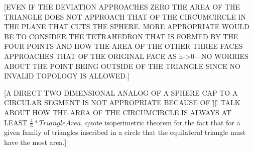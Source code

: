 [EVEN IF THE DEVIATION APPROACHES ZERO THE AREA OF THE TRIANGLE DOES NOT APPROACH THAT OF THE CIRCUMCIRCLE IN THE PLANE THAT CUTS THE SPHERE. MORE APPROPRIATE WOULD BE TO CONSIDER THE TETRAHEDRON THAT IS FORMED BY THE FOUR POINTS AND HOW THE AREA OF THE OTHER THREE FACES APPROACHES THAT OF THE ORIGINAL FACE AS h->0---NO WORRIES ABOUT THE POINT BEING OUTSIDE OF THE TRIANGLE SINCE NO INVALID TOPOLOGY IS ALLOWED.]

[A DIRECT TWO DIMENSIONAL ANALOG OF A SPHERE CAP TO A CIRCULAR SEGMENT IS NOT APPROPRIATE BECAUSE OF \^||\^. TALK ABOUT HOW THE AREA OF THE CIRCUMCIRCLE IS ALWAYS AT LEAST $\frac{4}{3} * TriangleArea$, quote isoperimetric theorem for the fact that for a given family of triangles inscribed in a circle that the equilateral triangle must have the most area.]
